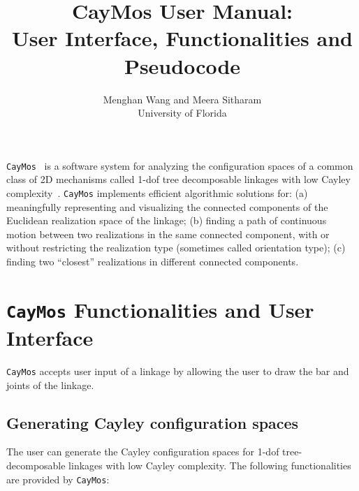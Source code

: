 \documentclass[10pt]{article}
\title{CayMos User Manual: \\User Interface, Functionalities and Pseudocode}
\author{Menghan Wang and Meera Sitharam \\ University of Florida}
\begin{document}
\maketitle

\texttt{CayMos}~\cite{bib:caymos} is a software system for analyzing the configuration spaces  of a common class of 2D mechanisms called 1-dof tree decomposable linkages with low Cayley complexity~\cite{Sitharam2011a}.
\texttt{CayMos} implements efficient algorithmic solutions for: (a) meaningfully representing and visualizing the connected components of the Euclidean realization space of the linkage; (b) finding a path of continuous motion between two realizations in the same connected component, with or without restricting the realization type (sometimes called orientation type); (c) finding two ``closest'' realizations in different connected components. 


\section{\texttt{CayMos} Functionalities and User Interface}

\texttt{CayMos} accepts user input of a linkage by 
allowing the user to draw the bar and joints of the linkage. 





\subsection{Generating Cayley configuration spaces}\label{subsec:ccs}



The user can generate the Cayley configuration spaces for 1-dof tree-decomposable linkages with low Cayley complexity. 
The following functionalities are provided by \texttt{CayMos}: 
\end{document}
